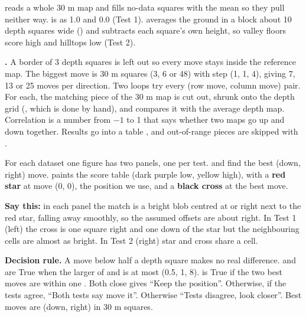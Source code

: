  reads a whole 30 m map and fills no-data squares with the mean so they pull neither way.  is  as 1.0 and 0.0 (Test 1).  averages the ground in a block about 10 depth squares wide () and subtracts each square's own height, so valley floors score high and hilltops low (Test 2).

\textbf{.} A border of 3 depth squares is left out so every move stays inside the reference map. The biggest move is  30 m squares (3, 6 or 48) with step  (1, 1, 4), giving 7, 13 or 25 moves per direction. Two loops try every (row move, column move) pair. For each, the matching piece of the 30 m map is cut out, shrunk onto the depth grid (, which is  done by hand), and  compares it with the average depth map. Correlation is a number from $-1$ to 1 that says whether two maps go up and down together. Results go into a table , and out-of-range pieces are skipped with .

For each dataset one figure has two panels, one per test.  and  find the best (down, right) move.  paints the score table (dark purple low, yellow high), with a \textbf{red star} at move (0, 0), the position we use, and a \textbf{black cross} at the best move.


\textbf{Say this:} in each panel the match is a bright blob centred at or right next to the red star, falling away smoothly, so the assumed offsets are about right. In Test 1 (left) the cross is one square right and one down of the star but the neighbouring cells are almost as bright. In Test 2 (right) star and cross share a cell.

\textbf{Decision rule.} A move below half a depth square makes no real difference.  and  are True when the larger of  and  is at most  (0.5, 1, 8).  is True if the two best moves are within one . Both close gives ``Keep the position''. Otherwise, if the tests agree, ``Both tests say move it''. Otherwise ``Tests disagree, look closer''. Best moves are (down, right) in 30 m squares.


